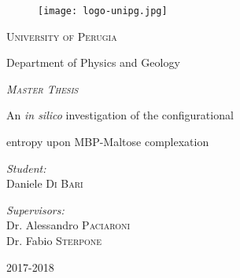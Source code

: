 \begin{titlepage}
\pagestyle{empty}
\begin{center}
\begin{figure}[H]
\centering

\vspace{1cm}
\texttt{[image: logo-unipg.jpg]}
\end{figure}

 
\vspace{1cm}
{\Large \textsc{University of Perugia}}

\vspace{0.25cm} 
{\Large Department of Physics and Geology}

\vspace{2.5cm}
\begin{large}
\emph{\textsc{Master Thesis}}
\end{large}

\vspace{1cm}
\begin{LARGE}
An \textit{in silico} investigation of the configurational

\vspace{0.275cm}

entropy upon MBP-Maltose complexation
\end{LARGE}

\vspace{2.5cm}
\begin{minipage}{0.4\textwidth}
\begin{flushleft} \large
\emph{Student:}\\
Daniele \textsc{Di Bari}
\end{flushleft}
\end{minipage}
\hfill
\begin{minipage}{0.5\textwidth}
\begin{flushright} \large
\emph{Supervisors:} \\
Dr. Alessandro \textsc{Paciaroni}\\
Dr. Fabio \textsc{Sterpone}
\end{flushright}
\end{minipage}

\vspace{1cm}
{2017-2018}
\end{center}
\cleardoublepage
	
\end{titlepage}

